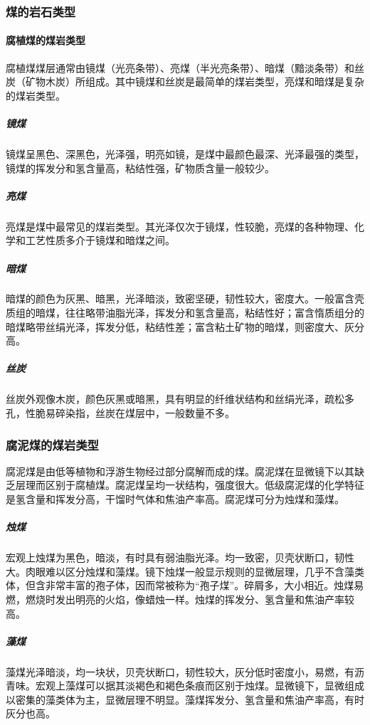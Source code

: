 \documentclass[10pt,openany]{ctexbook}
\begin{document}
\subsubsection{煤的岩石类型}
\paragraph{腐植煤的煤岩类型} 腐植煤煤层通常由镜煤（光亮条带）、亮煤（半光亮条带）、暗煤（黯淡条带）和丝炭（矿物木炭）所组成。其中镜煤和丝炭是最简单的煤岩类型，亮煤和暗煤是复杂的煤岩类型。
\subparagraph{镜煤} 镜煤呈黑色、深黑色，光泽强，明亮如镜，是煤中最颜色最深、光泽最强的类型，镜煤的挥发分和氢含量高，粘结性强，矿物质含量一般较少。
\subparagraph{亮煤} 亮煤是煤中最常见的煤岩类型。其光泽仅次于镜煤，性较脆，亮煤的各种物理、化学和工艺性质多介于镜煤和暗煤之间。
\subparagraph{暗煤}  暗煤的颜色为灰黑、暗黑，光泽暗淡，致密坚硬，韧性较大，密度大。一般富含壳质组的暗煤，往往略带油脂光泽，挥发分和氢含量高，粘结性好；富含惰质组分的暗煤略带丝绢光泽，挥发分低，粘结性差；富含粘土矿物的暗煤，则密度大、灰分高。
\subparagraph{丝炭} 丝炭外观像木炭，颜色灰黑或暗黑，具有明显的纤维状结构和丝绢光泽，疏松多孔，性脆易碎染指，丝炭在煤层中，一般数量不多。

\subsubsection{腐泥煤的煤岩类型} 腐泥煤是由低等植物和浮游生物经过部分腐解而成的煤。腐泥煤在显微镜下以其缺乏层理而区别于腐植煤。腐泥煤呈均一状结构，强度很大。低级腐泥煤的化学特征是氢含量和挥发分高，干馏时气体和焦油产率高。腐泥煤可分为烛煤和藻煤。
\subparagraph{烛煤} 宏观上烛煤为黑色，暗淡，有时具有弱油脂光泽。均一致密，贝壳状断口，韧性大。肉眼难以区分烛煤和藻煤。镜下烛煤一般显示规则的显微层理，几乎不含藻类体，但含非常丰富的孢子体，因而常被称为“孢子煤”。碎屑多，大小相近。烛煤易燃，燃烧时发出明亮的火焰，像蜡烛一样。烛煤的挥发分、氢含量和焦油产率较高。

\subparagraph{藻煤}     藻煤光泽暗淡，均一块状，贝壳状断口，韧性较大，灰分低时密度小，易燃，有沥青味。宏观上藻煤可以据其淡褐色和褐色条痕而区别于烛煤。显微镜下，显微组成以密集的藻类体为主，显微层理不明显。藻煤挥发分、氢含量和焦油产率高，有时灰分也高。
\end{document}
